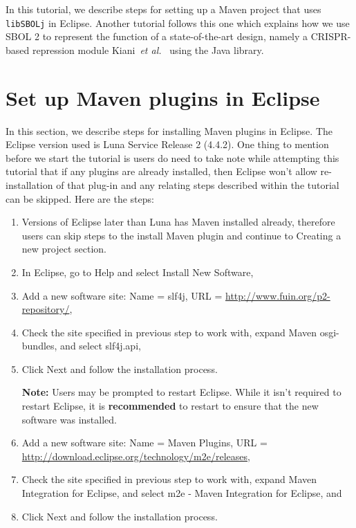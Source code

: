 \noindent In this tutorial, we describe steps for setting up a Maven
project that uses {\tt libSBOLj} in Eclipse. Another tutorial follows this one which explains how we use SBOL
2 to represent the function of a state-of-the-art design, namely a
CRISPR-based repression module Kiani~\textit{et
  al.}~\cite{kiani2014crispr} using the Java library. 

\section*{Set up Maven plugins in Eclipse}
In this section, we describe steps for installing Maven plugins in Eclipse. The Eclipse version used is Luna Service Release 2 (4.4.2). One thing to mention before we start the tutorial is users do need to take note while attempting this tutorial that if any plugins are already installed, then Eclipse won't allow re-installation of that plug-in and any relating steps described within the tutorial can be skipped. Here are the steps:
\begin{enumerate}
\item Versions of Eclipse later than Luna has Maven installed already, therefore users can skip steps to the install Maven plugin and continue to Creating a new project section.
\item In Eclipse, go to Help and select Install New Software,
\item Add a new software site: Name = slf4j, URL = \url{http://www.fuin.org/p2-repository/}, 
\item Check the site specified in previous step to work with, expand Maven osgi-bundles, and select slf4j.api, 
\item Click Next and follow the installation process.

\quad \textbf{Note:} Users may be prompted to restart Eclipse. While it isn't required to restart Eclipse, it is \textbf{recommended} to restart to ensure that the new software was installed.   

\item Add a new software site: Name = Maven Plugins, URL = \url{http://download.eclipse.org/technology/m2e/releases}, 
\item Check the site specified in previous step to work with, expand Maven Integration for Eclipse, and select m2e - Maven Integration for Eclipse, and
\item Click Next and follow the installation process.
\end{enumerate}

